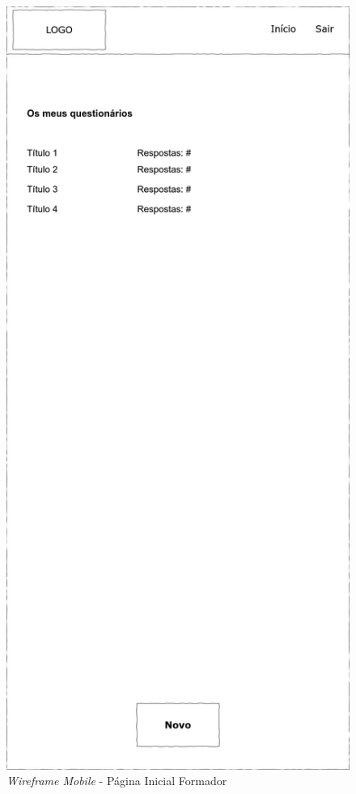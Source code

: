 \documentclass[12pt,a4paper,final]{article}
\begin{document}
    \begin{figure}[H]
        \centering
        \includegraphics[width=\textwidth,height=0.9\textheight,keepaspectratio]{wireframes/questionarios.wireframes-formador-geral-mobile.drawio}
        \caption{\textit{Wireframe Mobile} - Página Inicial Formador}
        \label{fig:wm-pif}
    \end{figure}
\end{document}
